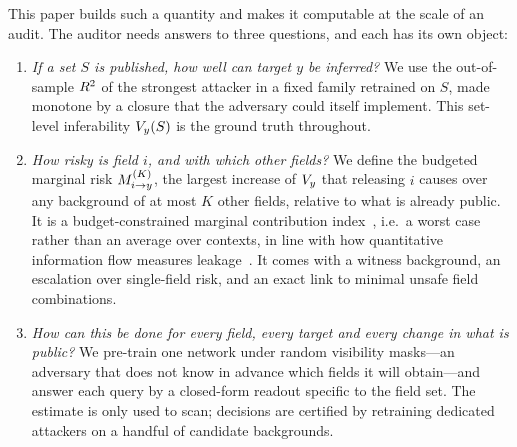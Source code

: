 This paper builds such a quantity and makes it computable at the scale of an audit. The
auditor needs answers to three questions, and each has its own object:
\begin{enumerate}
\item \emph{If a set $S$ is published, how well can target $y$ be inferred?} We use the
out-of-sample $R^{2}$ of the strongest attacker in a fixed family retrained on $S$, made monotone
by a closure that the adversary could itself implement. This set-level inferability $V_{y}(S)$ is
the ground truth throughout.
\item \emph{How risky is field $i$, and with which other fields?} We define the budgeted
marginal risk $M^{(K)}_{i \to y}$, the largest increase of $V_{y}$ that releasing $i$ causes over any background
of at most $K$ other fields, relative to what is already public. It is a budget-constrained
marginal contribution index~\cite{catav2021mci}, i.e.\ a worst case rather than an average over
contexts, in line with how quantitative information flow measures
leakage~\cite{smith2009qif,alvim2012gleakage}. It comes with a witness background, an escalation
over single-field risk, and an exact link to minimal unsafe field combinations.
\item \emph{How can this be done for every field, every target and every change in what is
public?} We pre-train one network under random visibility masks---an adversary that does not
know in advance which fields it will obtain---and answer each query by a closed-form readout
specific to the field set. The estimate is only used to scan; decisions are certified by
retraining dedicated attackers on a handful of candidate backgrounds.
\end{enumerate}

